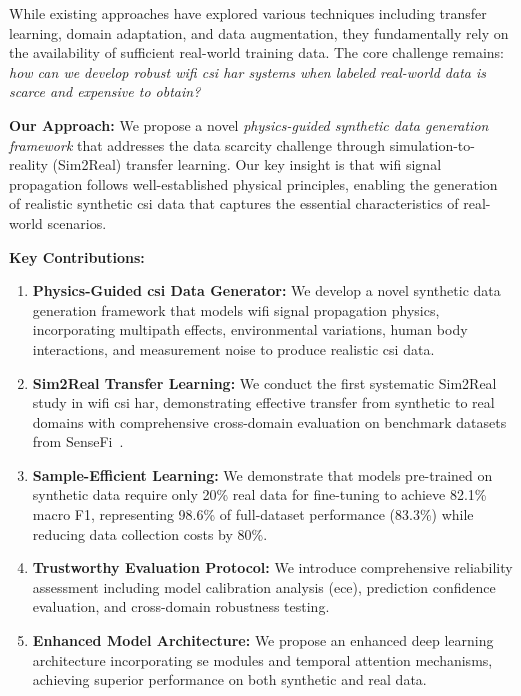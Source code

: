 \documentclass[journal]{IEEEtran}
\begin{document}
While existing approaches have explored various techniques including transfer learning, domain adaptation, and data augmentation, they fundamentally rely on the availability of sufficient real-world training data. The core challenge remains: \textit{how can we develop robust \gls{wifi} \gls{csi} \gls{har} systems when labeled real-world data is scarce and expensive to obtain?}

\textbf{Our Approach:} We propose a novel \textit{physics-guided synthetic data generation framework} that addresses the data scarcity challenge through simulation-to-reality (Sim2Real) transfer learning. Our key insight is that \gls{wifi} signal propagation follows well-established physical principles, enabling the generation of realistic synthetic \gls{csi} data that captures the essential characteristics of real-world scenarios.

\textbf{Key Contributions:}
\begin{enumerate}
\item \textbf{Physics-Guided \gls{csi} Data Generator:} We develop a novel synthetic data generation framework that models \gls{wifi} signal propagation physics, incorporating multipath effects, environmental variations, human body interactions, and measurement noise to produce realistic \gls{csi} data.

\item \textbf{Sim2Real Transfer Learning:} We conduct the first systematic Sim2Real study in \gls{wifi} \gls{csi} \gls{har}, demonstrating effective transfer from synthetic to real domains with comprehensive cross-domain evaluation on benchmark datasets from SenseFi~\cite{yang2023sensefi}.

\item \textbf{Sample-Efficient Learning:} We demonstrate that models pre-trained on synthetic data require only 20\% real data for fine-tuning to achieve 82.1\% macro F1, representing 98.6\% of full-dataset performance (83.3\%) while reducing data collection costs by 80\%.

\item \textbf{Trustworthy Evaluation Protocol:} We introduce comprehensive reliability assessment including model calibration analysis (\gls{ece}), prediction confidence evaluation, and cross-domain robustness testing.

\item \textbf{Enhanced Model Architecture:} We propose an enhanced deep learning architecture incorporating \gls{se} modules and temporal attention mechanisms, achieving superior performance on both synthetic and real data.
\end{enumerate}
\end{document}
